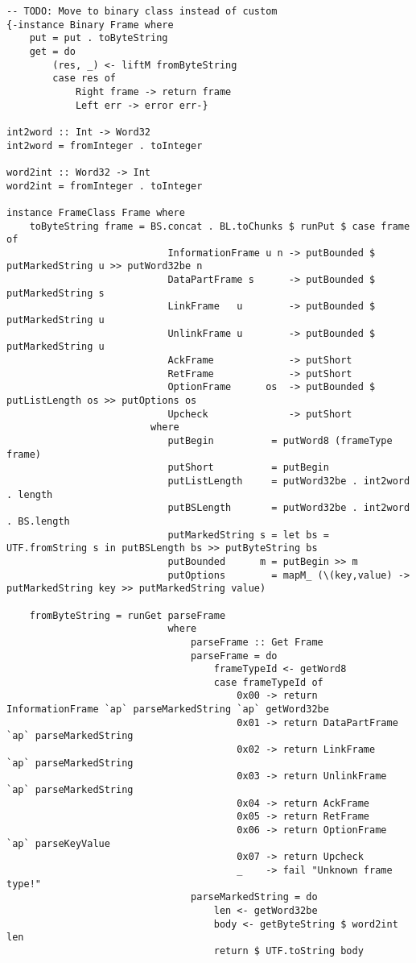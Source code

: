 \documentclass[russian,utf8,simple,emptystyle]{eskdtext}
\begin{document}
\begin{lstlisting}
-- TODO: Move to binary class instead of custom
{-instance Binary Frame where
    put = put . toByteString
    get = do
        (res, _) <- liftM fromByteString
        case res of 
            Right frame -> return frame 
            Left err -> error err-}

int2word :: Int -> Word32 
int2word = fromInteger . toInteger

word2int :: Word32 -> Int 
word2int = fromInteger . toInteger

instance FrameClass Frame where
    toByteString frame = BS.concat . BL.toChunks $ runPut $ case frame of 
                            InformationFrame u n -> putBounded $ putMarkedString u >> putWord32be n
                            DataPartFrame s      -> putBounded $ putMarkedString s 
                            LinkFrame   u        -> putBounded $ putMarkedString u
                            UnlinkFrame u        -> putBounded $ putMarkedString u
                            AckFrame             -> putShort
                            RetFrame             -> putShort
                            OptionFrame      os  -> putBounded $ putListLength os >> putOptions os
                            Upcheck              -> putShort
                         where 
                            putBegin          = putWord8 (frameType frame)
                            putShort          = putBegin
                            putListLength     = putWord32be . int2word . length
                            putBSLength       = putWord32be . int2word . BS.length
                            putMarkedString s = let bs = UTF.fromString s in putBSLength bs >> putByteString bs
                            putBounded      m = putBegin >> m
                            putOptions        = mapM_ (\(key,value) -> putMarkedString key >> putMarkedString value)

    fromByteString = runGet parseFrame
                            where
                                parseFrame :: Get Frame
                                parseFrame = do
                                    frameTypeId <- getWord8
                                    case frameTypeId of
                                        0x00 -> return InformationFrame `ap` parseMarkedString `ap` getWord32be
                                        0x01 -> return DataPartFrame `ap` parseMarkedString
                                        0x02 -> return LinkFrame   `ap` parseMarkedString
                                        0x03 -> return UnlinkFrame `ap` parseMarkedString
                                        0x04 -> return AckFrame
                                        0x05 -> return RetFrame
                                        0x06 -> return OptionFrame `ap` parseKeyValue
                                        0x07 -> return Upcheck
                                        _    -> fail "Unknown frame type!"
                                parseMarkedString = do
                                    len <- getWord32be
                                    body <- getByteString $ word2int len 
                                    return $ UTF.toString body


\end{lstlisting}
\end{document}
